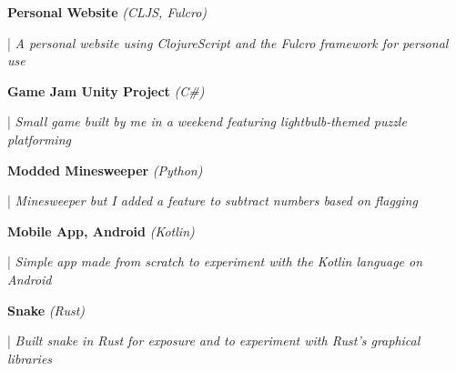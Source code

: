 \documentclass[letterpaper,11pt]{article}
\begin{document}
\begin{minipage}[t]{0.28\textwidth}
    \raggedright
    \textbf{ Personal Website }\textit{(CLJS, Fulcro)} \\
\end{minipage}
\hfill
\begin{minipage}[t]{0.70\textwidth}
    \raggedright
    |\textit{ A personal website using ClojureScript and the Fulcro framework for personal use} \\
\end{minipage}

\begin{minipage}[t]{0.28\textwidth}
    \raggedright
    \textbf{ Game Jam Unity Project }\textit{(C\#)} \\
\end{minipage}
\hfill
\begin{minipage}[t]{0.70\textwidth}
    \raggedright
    |\textit{ Small game built by me in a weekend featuring lightbulb-themed puzzle platforming} \\
\end{minipage}

\begin{minipage}[t]{0.28\textwidth}
    \raggedright
    \textbf{ Modded Minesweeper }\textit{(Python)} \\
\end{minipage}
\hfill
\begin{minipage}[t]{0.70\textwidth}
    \raggedright
    |\textit{ Minesweeper but I added a feature to subtract numbers based on flagging} \\
\end{minipage}

\begin{minipage}[t]{0.28\textwidth}
    \raggedright
    \textbf{ Mobile App, Android }\textit{(Kotlin)} \\
\end{minipage}
\hfill
\begin{minipage}[t]{0.70\textwidth}
    \raggedright
    |\textit{ Simple app made from scratch to experiment with the Kotlin language on Android} \\
\end{minipage}

\begin{minipage}[t]{0.28\textwidth}
    \raggedright
    \textbf{ Snake }\textit{(Rust)}\\
\end{minipage}
\hfill
\begin{minipage}[t]{0.70\textwidth}
    \raggedright
    |\textit{ Built snake in Rust for exposure and to experiment with Rust's graphical libraries} \\
\end{minipage}
\end{document}
